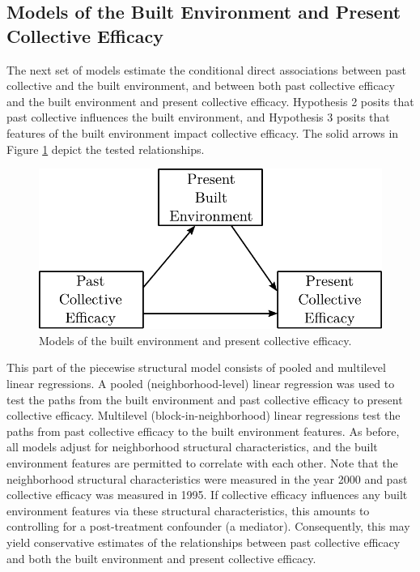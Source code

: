 \documentclass [11pt, proquest] {uwthesis}[2015/03/03]
\begin{document}
\hypertarget{models-of-the-built-environment-and-present-collective-efficacy}{%
\subsection{Models of the Built Environment and Present Collective Efficacy}\label{models-of-the-built-environment-and-present-collective-efficacy}}

The next set of models estimate the conditional direct associations between past collective and the built environment, and between both past collective efficacy and the built environment and present collective efficacy. Hypothesis 2 posits that past collective influences the built environment, and Hypothesis 3 posits that features of the built environment impact collective efficacy. The solid arrows in Figure \ref{fig:cebemodel} depict the tested relationships.
\begin{figure}

{\centering \includegraphics[width=0.75\linewidth]{./figure/ch2/ce_be_model} 

}

\caption{Models of the built environment and present collective efficacy.}\label{fig:cebemodel}
\end{figure}
This part of the piecewise structural model consists of pooled and multilevel linear regressions. A pooled (neighborhood-level) linear regression was used to test the paths from the built environment and past collective efficacy to present collective efficacy. Multilevel (block-in-neighborhood) linear regressions test the paths from past collective efficacy to the built environment features. As before, all models adjust for neighborhood structural characteristics, and the built environment features are permitted to correlate with each other. Note that the neighborhood structural characteristics were measured in the year 2000 and past collective efficacy was measured in 1995. If collective efficacy influences any built environment features via these structural characteristics, this amounts to controlling for a post-treatment confounder (a mediator). Consequently, this may yield conservative estimates of the relationships between past collective efficacy and both the built environment and present collective efficacy.
\end{document}
